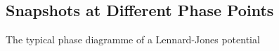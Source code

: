 \subsection{Snapshots at Different Phase Points}
The typical phase diagramme of a Lennard-Jones potential
\begin{figure}
\begin{minipage}[t]{\textwidth}
\begin{minipage}[t]{0.475\textwidth}
	\centering
\end{minipage}
\hspace{0.5cm}
\begin{minipage}[t]{0.475\textwidth}
	\centering
\end{minipage}
\end{minipage}
\end{figure}
